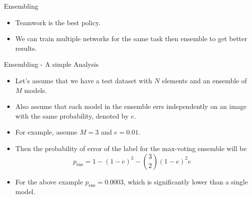 \begin{frame}{Ensembling}
    \begin{itemize}
        \item Teamwork is the best policy.
        \item We can train multiple networks for the same task then ensemble to get better results.
    \end{itemize}
\end{frame}

\begin{frame}{Ensembling - A simple Analysis}
    \begin{itemize}
        \item Let's assume that we have a test dataset with $N$ elements and an ensemble of $M$ models.
        \item Also assume that each model in the ensemble errs independently on an image with the same probability, denoted by $e$.
        \item For example, assume $M=3$ and $e = 0.01$.
        \item Then the probability of error of the label for the max-voting ensemble will be
        $$p_{\text{ens}} = 1 - (1-e)^3 - \binom 32 (1-e)^2 e$$
        \item For the above example $p_{\text{ens}}=0.0003$, which is significantly lower than a single model.
    \end{itemize}
\end{frame} 